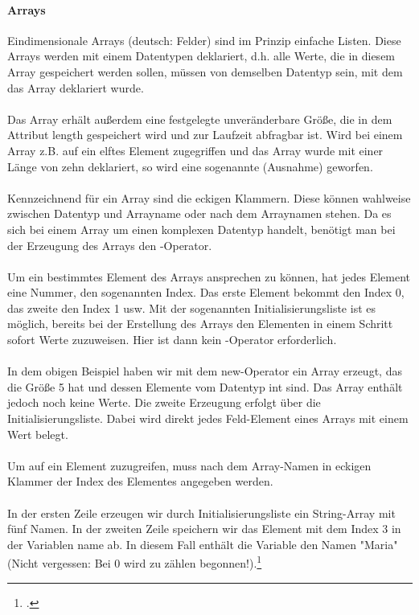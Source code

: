\paragraph{Arrays}
Eindimensionale Arrays (deutsch: Felder) sind im Prinzip einfache Listen. Diese Arrays werden mit einem Datentypen deklariert, d.h. alle Werte, die in diesem Array gespeichert werden sollen, müssen von demselben Datentyp sein, mit dem das Array deklariert wurde.\\
\\
Das Array erhält außerdem eine festgelegte unveränderbare Größe, die in dem Attribut length gespeichert wird und zur Laufzeit abfragbar ist. Wird bei einem Array z.B. auf ein elftes Element zugegriffen und das Array wurde mit einer Länge von zehn deklariert, so wird eine sogenannte  (Ausnahme) geworfen. \\
\\
Kennzeichnend für ein Array sind die eckigen Klammern. Diese können wahlweise zwischen Datentyp und Arrayname oder nach dem Arraynamen stehen. Da es sich bei einem Array um einen komplexen Datentyp handelt, benötigt man bei der Erzeugung des Arrays den -Operator.\\
\\
Um ein bestimmtes Element des Arrays ansprechen zu können, hat jedes Element eine Nummer, den sogenannten Index. Das erste Element bekommt den Index 0, das zweite den Index 1 usw. Mit der sogenannten Initialisierungsliste ist es möglich, bereits bei der Erstellung des Arrays den Elementen in einem Schritt sofort Werte zuzuweisen. Hier ist dann kein -Operator erforderlich.\\

\ \\
In dem obigen Beispiel haben wir mit dem new-Operator ein Array erzeugt, das die Größe 5 hat und dessen Elemente vom Datentyp int sind. Das Array enthält jedoch noch keine Werte. Die zweite Erzeugung erfolgt über die  Initialisierungsliste. Dabei wird direkt jedes Feld-Element eines Arrays mit einem Wert belegt.\\
\\
Um auf ein Element zuzugreifen, muss nach dem Array-Namen in eckigen Klammer der Index des Elementes angegeben werden.\\

\ \\
In der ersten Zeile erzeugen wir durch Initialisierungsliste ein String-Array mit fünf Namen. In der zweiten Zeile speichern wir das Element mit dem Index 3 in der Variablen name ab. In diesem Fall enthält die Variable den Namen "Maria" (Nicht vergessen: Bei 0 wird zu zählen begonnen!).\footcite{shit_java_tut}